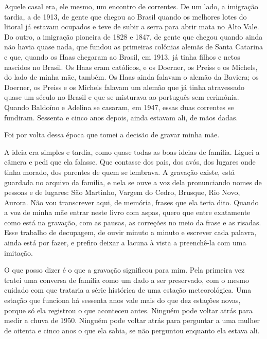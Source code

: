 \documentclass[
  brazilian,
  11pt,
  openany]{book}
\begin{document}
Aquele casal era, ele mesmo, um encontro de correntes. De um lado, a
imigração tardia, a de 1913, de gente que chegou ao Brasil quando os
melhores lotes do litoral já estavam ocupados e teve de subir a serra
para abrir mata no Alto Vale. Do outro, a imigração pioneira de 1828 e
1847, de gente que chegou quando ainda não havia quase nada, que fundou
as primeiras colônias alemãs de Santa Catarina e que, quando os Haas
chegaram ao Brasil, em 1913, já tinha filhos e netos nascidos no Brasil.
Os Haas eram católicos, e os Doerner, os Preiss e os Michels, do lado de
minha mãe, também. Os Haas ainda falavam o alemão da Baviera; os
Doerner, os Preiss e os Michels falavam um alemão que já tinha
atravessado quase um século no Brasil e que se misturava ao português
sem cerimônia. Quando Baldoíno e Adelina se casaram, em 1947, essas duas
correntes se fundiram. Sessenta e cinco anos depois, ainda estavam ali,
de mãos dadas.

Foi por volta dessa época que tomei a decisão de gravar minha mãe.

A ideia era simples e tardia, como quase todas as boas ideias de
família. Liguei a câmera e pedi que ela falasse. Que contasse dos pais,
dos avós, dos lugares onde tinha morado, dos parentes de quem se
lembrava. A gravação existe, está guardada no arquivo da família, e nela
se ouve a voz dela pronunciando nomes de pessoas e de lugares: São
Martinho, Vargem do Cedro, Brusque, Rio Novo, Aurora. Não vou
transcrever aqui, de memória, frases que ela teria dito. Quando a voz de
minha mãe entrar neste livro com aspas, quero que entre exatamente como
está na gravação, com as pausas, as correções no meio da frase e as
risadas. Esse trabalho de decupagem, de ouvir minuto a minuto e escrever
cada palavra, ainda está por fazer, e prefiro deixar a lacuna à vista a
preenchê-la com uma imitação.

O que posso dizer é o que a gravação significou para mim. Pela primeira
vez tratei uma conversa de família como um dado a ser preservado, com o
mesmo cuidado com que trataria a série histórica de uma estação
meteorológica. Uma estação que funciona há sessenta anos vale mais do
que dez estações novas, porque só ela registrou o que aconteceu antes.
Ninguém pode voltar atrás para medir a chuva de 1950. Ninguém pode
voltar atrás para perguntar a uma mulher de oitenta e cinco anos o que
ela sabia, se não perguntou enquanto ela estava ali.
\end{document}
